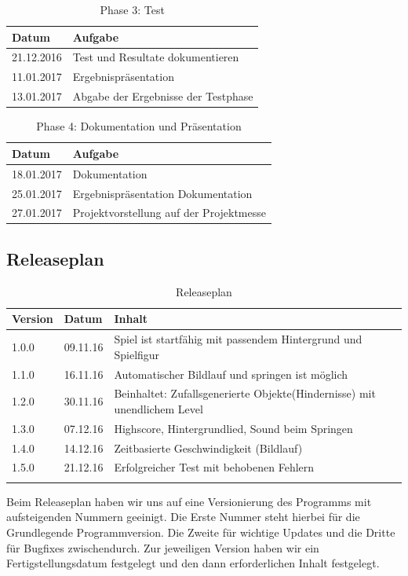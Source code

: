 \begin{table}[h]
	\begin{tabular}{l|l}
		\toprule
		\textbf{Datum}& \textbf{Aufgabe}\\
		\midrule
		21.12.2016 & Test und Resultate dokumentieren 	\\ 
		11.01.2017 & Ergebnispräsentation	\\
		13.01.2017 & Abgabe der Ergebnisse der Testphase	\\ 
		\bottomrule
	\end{tabular}
	\caption{Phase 3: Test}
\end{table}
\begin{table}[h]
	\begin{tabular}{l|l}
		\toprule
		\textbf{Datum}& \textbf{Aufgabe}\\
		\midrule
		18.01.2017 & Dokumentation 	\\ 
		25.01.2017 & Ergebnispräsentation Dokumentation	\\
		27.01.2017 & Projektvorstellung auf der Projektmesse	\\ 
		\bottomrule
	\end{tabular}
	\caption{Phase 4: Dokumentation und Präsentation}
\end{table}
\newpage
\subsection{Releaseplan}
\begin{longtable}{l|l|p{10cm}}
	\toprule
	\textbf{Version} & \textbf{Datum} & \textbf{Inhalt}\\
	\midrule
	1.0.0 & 09.11.16 & Spiel ist startfähig mit passendem Hintergrund und Spielfigur\\ 
	1.1.0 & 16.11.16 & Automatischer Bildlauf und springen ist möglich\\
	1.2.0 & 30.11.16 & Beinhaltet: Zufallsgenerierte Objekte(Hindernisse) mit unendlichem Level\\ 
	1.3.0 & 07.12.16 & Highscore, Hintergrundlied, Sound beim Springen\\
	1.4.0 & 14.12.16 & Zeitbasierte Geschwindigkeit (Bildlauf)\\
	1.5.0 & 21.12.16 & Erfolgreicher Test mit behobenen Fehlern\\
	\bottomrule
 	\caption{Releaseplan}
\end{longtable}
Beim Releaseplan haben wir uns auf eine Versionierung des Programms mit aufsteigenden Nummern geeinigt. Die Erste Nummer steht hierbei für die Grundlegende Programmversion. Die Zweite für wichtige Updates und die Dritte für Bugfixes zwischendurch. Zur jeweiligen Version haben wir ein Fertigstellungsdatum festgelegt und den dann erforderlichen Inhalt festgelegt.
\newpage
